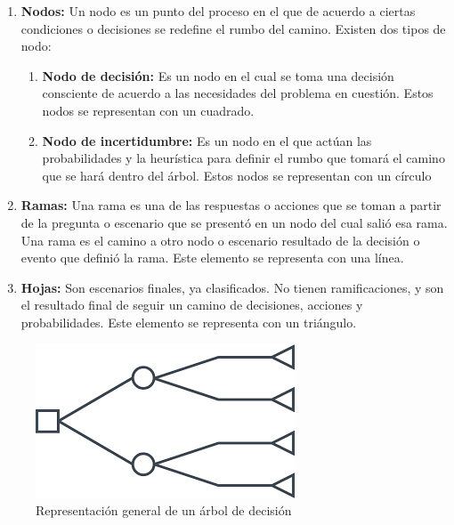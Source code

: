 \begin{enumerate}
	\item \textbf{Nodos:} Un nodo es un punto del proceso en el que de acuerdo a ciertas condiciones o decisiones se redefine el rumbo del camino. Existen dos tipos de nodo:
	\begin{enumerate}
		\item \textbf{Nodo de decisión:} Es un nodo en el cual se toma una decisión consciente de acuerdo a las necesidades del problema en cuestión. Estos nodos se representan con un cuadrado.
		\item \textbf{Nodo de incertidumbre: } Es un nodo en el que actúan las probabilidades y la heurística para definir el rumbo que tomará el camino que se hará dentro del árbol. Estos nodos se representan con un círculo
	\end{enumerate}
	\item \textbf{Ramas:} Una rama es una de las respuestas o acciones que se toman a partir de la pregunta o escenario que se presentó en un nodo del cual salió esa rama. Una rama es el camino a otro nodo o escenario resultado de la decisión o evento que definió la rama. Este elemento se representa con una línea.
	\item \textbf{Hojas:} Son escenarios finales, ya clasificados. No tienen ramificaciones, y son el resultado final de seguir un camino de decisiones, acciones y probabilidades. Este elemento se representa con un triángulo.
\end{enumerate}

\begin{figure}[!htbp]
	\hypertarget{fig:arbol-decision-ejemplo}{\hspace{1pt}}
	\begin{center}
		\includegraphics[height=0.3\textheight]{capitulo2/images/arbol-decision-ejemplo.png}
		\caption{Representación general de un árbol de decisión}
		\label{fig:arbol-decision-ejemplo}
	\end{center}
\end{figure}

